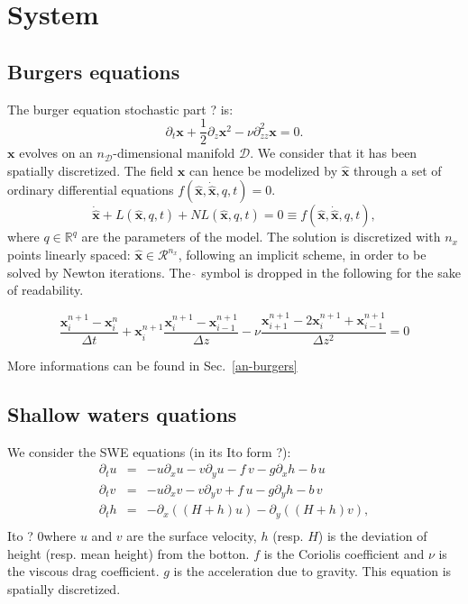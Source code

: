 \documentclass[aip,pof,nofootinbib,reprint,onecolumn]{revtex4-1}
\newcommand{\todo}[1]{{\color{red} #1 }}
\newcommand{\gras}[1]{\boldsymbol{#1}}
\newcommand{\mypar}[1]{\left(#1\right)}
\newcommand{\Ephaz}{\mathcal{D}}%
\newcommand{\Nphaz}{n_{\mathcal{D}}} %
\newcommand{\fdyn}{f} %
\newcommand{\point}{\gras{x}} %
\begin{document}
%
\section{System}
\label{sec-sys}

\subsection{Burgers equations}
\label{ssec-burgers}
The burger equation \todo{stochastic part ?}is:
$$ \partial_t \point + \frac{1}{2} \partial_z \point^2 - \nu \partial^2_{zz}\point = 0. $$
$\point$ evolves on an $\Nphaz$-dimensional manifold $\Ephaz$. 
We consider that it has been spatially discretized. The field $\point$ can hence be modelized by $\hat{\point}$ through a set of ordinary differential equations $ \fdyn(\hat{\point},\dot{\hat{\point}},q,t) =0.$
$$ \dot{\hat{\point}} + L(\hat{\point},q,t) + NL(\hat{\point},q,t) = 0 \equiv \fdyn(\hat{\point},\dot{\hat{\point}},q,t), $$
where $q\in \mathbb{R}^{q}$ are the parameters of the model.
The solution is discretized with $n_x$ points linearly spaced: $\hat{\point}\in \mathcal{R}^{n_x}$, following an implicit scheme, in order to be solved by Newton iterations. The $\hat{\,}$ symbol is dropped in the following for the sake of readability.

\begin{equation}
 \frac{\point^{n+1}_i - \point^{n}_i}{\Delta t} + \point^{n+1}_i \frac{\point^{n+1}_i - \point^{n+1}_{i-1}}{\Delta z} - \nu \frac{\point^{n+1}_{i+1} -2 \point^{n+1}_i + \point^{n+1}_{i-1}}{\Delta z ^2} = 0 
\label{eq-fdyn_burgers}
\end{equation}

More informations can be found in Sec.~\ref{an-burgers}


\subsection{Shallow waters quations}  \label{ssec-swe}
\todo{We consider the \todo{SWE} equations (in its Ito form ?):
\begin{equation}
\begin{array}{lll}
\partial_t u & =& - u \partial_x u - v \partial_y u - f\,v - g \partial_x h -b\,u\\ 
\partial_t v & =& - u \partial_x v - v \partial_y v + f\,u - g \partial_y h -b\,v\\
\partial_t h & =& - \partial_x \mypar{\mypar{H+h}u} - \partial_y \mypar{\mypar{H+h}v}, \\
\end{array}
\label{eq-swe}
\end{equation} 
\todo{Ito ?} 0where $u$ and $v$ are the surface velocity, $h$ (resp. $H$) is the deviation of height (resp. mean height) from the botton. $f$ is the Coriolis coefficient and $\nu$ is the viscous drag coefficient. $g$ is the acceleration due to gravity.
This equation is spatially discretized.}
\end{document}
